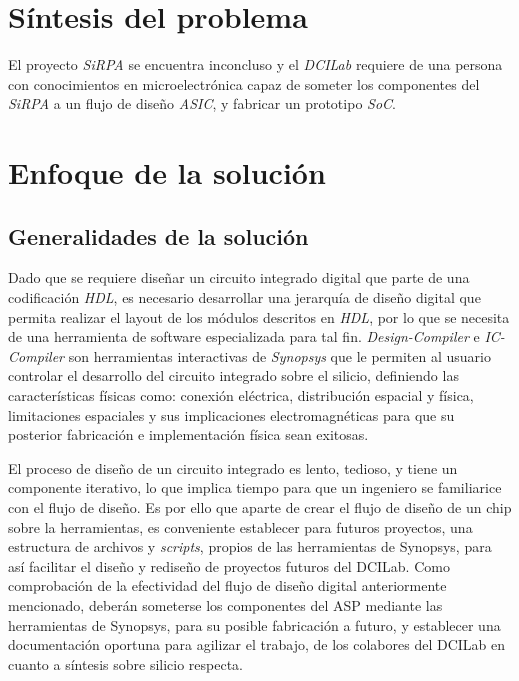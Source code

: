 \section{Síntesis del problema}
El proyecto \textit{SiRPA} se encuentra inconcluso y el \textit{DCILab} requiere de una persona con conocimientos en microelectrónica capaz de someter los componentes del \textit{SiRPA} a un flujo de diseño \textit{ASIC}, y fabricar un prototipo \textit{SoC}.

\section{Enfoque de la solución}

\subsection{Generalidades de la solución}

Dado que se requiere diseñar un circuito integrado digital que parte de una codificación \textit{HDL}, es necesario desarrollar una jerarquía de diseño digital que permita realizar el layout de los módulos descritos en \textit{HDL}, por lo que se necesita de una herramienta de software especializada para tal fin. \textit{Design-Compiler} e \textit{IC-Compiler} son herramientas interactivas de \textit{Synopsys} que le permiten al usuario controlar el desarrollo del circuito integrado sobre el silicio, definiendo las características físicas como: conexión eléctrica, distribución espacial y física, limitaciones espaciales y sus implicaciones electromagnéticas para que su posterior fabricación e implementación física sean exitosas.

El proceso de diseño de un circuito integrado es lento, tedioso, y tiene un componente iterativo, lo que implica tiempo para que un ingeniero se familiarice con el flujo de diseño. Es por ello que aparte de crear el flujo de diseño de un chip sobre la herramientas, es conveniente establecer para futuros proyectos, una estructura de archivos y \textit{scripts}, propios de las herramientas de Synopsys, para así facilitar el diseño y rediseño de proyectos futuros del DCILab. Como comprobación de la efectividad del flujo de diseño digital anteriormente mencionado, deberán someterse los componentes del ASP mediante las herramientas de  Synopsys, para su posible fabricación a futuro, y establecer una documentación oportuna para agilizar el trabajo, de los colabores del DCILab en cuanto a síntesis sobre silicio respecta.

